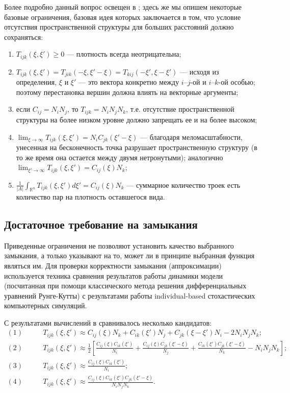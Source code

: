 Более подробно данный вопрос освещен в \cite{murlaw}; здесь же мы опишем некоторые базовые ограничения, базовая идея которых заключается в том, что условие отсутствия пространственной структуры для больших расстояний должно сохраняться:
\begin{enumerate}
	\item $  T_{ijk}(\xi,\xi')\ge0 $ --- плотность всегда неотрицательна;
	
	\item $ T_{ijk}(\xi,\xi')=T_{jik}(-\xi,\xi'-\xi)=T_{kij}(-\xi',\xi-\xi') $ --- исходя из определения, $\xi$ и $\xi'$ --- это вектора конкретно между $i$--$j$-ой и $i$--$k$-ой особью; поэтому перестановка вершин должна влиять на векторные аргументы;
	
	\item если $C_{ij}=N_{i}N_{j} $, то $ T_{ijk}=N_{i}N_{j}N_{k} $, т.е. отсутствие пространственной структуры на более низком уровне должно запрещать ее и на более высоком;
	
	\item $ \lim_{\xi\to\infty}T_{ijk}(\xi,\xi')=N_{i}C_{jk}(\xi'-\xi) $ --- благодаря меломасштабности, унесенная на бесконечность точка разрушает пространственную структуру (в то же время она остается между двумя нетронутыми); аналогично $\lim_{\xi'\to\infty}T_{ijk}(\xi,\xi')=C_{ij}(\xi)N_{k} $;
	
	\item $  \frac{1}{|A|}\int_{\mathbb{R}^{n}}T_{ijk}(\xi,\xi')d\xi'=C_{ij}(\xi)N_{k} $ --- суммарное количество троек есть количество пар на плотность оставшегося вида.
\end{enumerate}


\subsection{Достаточное требование на замыкания}

Приведенные ограничения не позволяют установить качество выбранного замыкания, а только указывают на то, может ли в принципе выбранная функция являться им. Для проверки корректности замыкания (аппроксимации) используется техника сравнения результатов работы динамики модели (посчитанная при помощи классического метода решения дифференциальных уравнений Рунге-Кутты) с результатами работы individual-based стохастических компьютерных симуляций.

С результатами вычислений в \cite{law_dieckmann_2000} сравнивалось несколько кандидатов:
\begin{align*}
(1) \qquad & T_{ijk}(\xi,\xi')\approx C_{ij}(\xi)N_{k}+C_{ik}(\xi')N_{j}+C_{jk}(\xi-\xi')N_{i}-2N_{i}N_{j}N_{k};\\
(2) \qquad &  T_{ijk}(\xi,\xi')\approx\frac{1}{2}\left[\frac{C_{ij}(\xi)C_{ik}(\xi')}{N_{i}}+\frac{C_{ij}(\xi)C_{jk}(\xi'-\xi)}{N_{j}}+\frac{C_{ik}(\xi')C_{jk}(\xi'-\xi)}{N_{k}}-N_{i}N_{j}N_{k}\right];
\\
(3) \qquad & T_{ijk}(\xi,\xi')\approx\frac{C_{ij}(\xi)C_{ik}(\xi')}{N_{i}};
\\
(4) \qquad &    T_{ijk}(\xi,\xi')\approx\frac{C_{ij}(\xi)C_{ik}(\xi')C_{jk}(\xi'-\xi)}{N_{i}N_{j}N_{k}}.
\end{align*}

